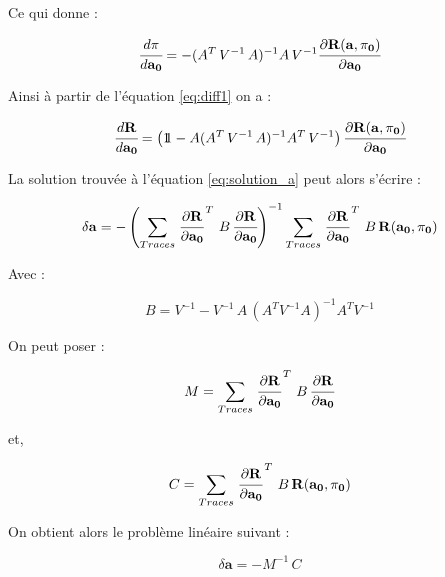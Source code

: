    Ce qui donne :
   
   \begin{equation}
    \cfrac{ d \mathbf{\pi} }{d \mathbf{a_0}} = - (A^T \, V^{-1} \, A)^{-1} A \, V^{-1}  \cfrac{ \partial \mathbf{R}(\mathbf{a}, \mathbf{\pi_0}) }{ \partial \mathbf{a_0}}
   \end{equation}
   
   Ainsi \`a partir de l'\'equation \ref{eq:diff1} on a :
   
   \begin{equation}
    \cfrac{ d \mathbf{R} }{d \mathbf{a_0}} = \left( 1\!\!1 - A (A^T \, V^{-1} \, A)^{-1} A^T \, V^{-1} \right) \cfrac{ \partial \mathbf{R}(\mathbf{a}, \mathbf{\pi_0}) }{ \partial \mathbf{a_0}}
   \end{equation}

   La solution trouv\'ee \`a l'\'equation \ref{eq:solution_a} peut alors s'\'ecrire :
   
   \begin{equation}
   \delta \mathbf{a} = - \left( \sum_{Traces} \left. \cfrac{ \partial \mathbf{R}}{ \partial \mathbf{a_0}} \right.^T \, B \, \cfrac{ \partial \mathbf{R}}{ \partial \mathbf{a_0}} \right)^{-1} \sum_{Traces} \left. \cfrac{ \partial \mathbf{R}}{ \partial \mathbf{a_0}} \right.^T \, B \, \mathbf{R}(\mathbf{a_0}, \mathbf{\pi_0}) 
   \end{equation}

   Avec :
   
   \begin{equation}
    B = V^{-1} - V^{-1} \, A \, (A^T V^{-1} A)^{-1} A^T V^{-1}
   \end{equation}

   On peut poser :
   
   \begin{equation}
    M = \sum_{Traces} \left. \cfrac{ \partial \mathbf{R}}{ \partial \mathbf{a_0}} \right.^T \, B \, \cfrac{ \partial \mathbf{R}}{ \partial \mathbf{a_0}}
   \end{equation}

   et,
   
   \begin{equation}
    C = \sum_{Traces} \left. \cfrac{ \partial \mathbf{R}}{ \partial \mathbf{a_0}} \right.^T \, B \, \mathbf{R}(\mathbf{a_0}, \mathbf{\pi_0})
   \end{equation}

   On obtient alors le probl\`eme lin\'eaire suivant :
   
   \begin{equation}
    \delta \mathbf{a} = - M^{-1} \, C
    \label{eq:leastSquareGlobal}
   \end{equation}

